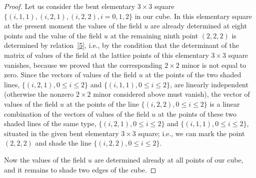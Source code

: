 \documentclass[11pt]{article}
\begin{document}
\begin{proof}
Let us consider the bent elementary $3 \times 3$ square $\{(i, 1,
1), (i, 2, 1), (i, 2, 2), i = 0, 1, 2\}$ in our cube. In this
elementary square at the present moment the values of the f\/ield $u$
are already determined at eight points and the value of the f\/ield
$u$ at the remaining ninth point $(2, 2, 2)$ is determined by
relation~\eqref{5}, i.e., by the condition that the
determinant of the matrix of values of the f\/ield at the lattice
points of this elementary $3 \times 3$ square vanishes, because we
proved that the corresponding $2 \times 2$ minor is not equal to
zero. Since the vectors of values of the f\/ield $u$ at the points of
the two shaded lines, $\{(i, 2, 1), 0 \leq i \leq 2\}$ and $\{(i, 1,
1), 0 \leq i \leq 2\}$, are linearly independent (otherwise the
nonzero $2 \times 2$ minor considered above must vanish), the vector
of values of the f\/ield $u$ at the points of the line $\{(i, 2, 2), 0
\leq i \leq 2\}$ is a linear combination of the vectors of values of
the f\/ield $u$ at the points of these two shaded lines of the same
type, $\{(i, 2, 1), 0 \leq i \leq 2\}$ and $\{(i, 1, 1), 0 \leq i
\leq 2\}$, situated in the given bent elementary $3 \times 3$
square; i.e., we can mark the point $(2, 2, 2)$ and shade the line
$\{(i, 2, 2), 0 \leq i \leq 2\}$.


Now the values of the f\/ield $u$ are determined already at all points
of our cube, and it remains to shade two edges of the cube.



\end{proof}
\end{document}
